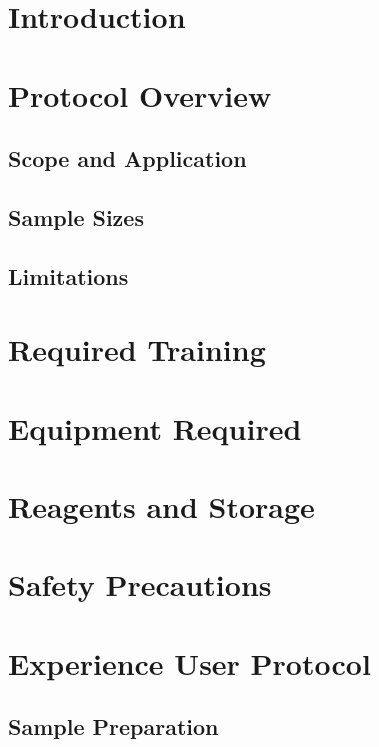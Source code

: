 
\LongTitle{}
\version{}


\protocols{}

\clearpage
\sectTOC{}
\clearpage

\section{Introduction}

\section{Protocol Overview}
\subsection{Scope and Application}
\subsection{Sample Sizes}
\subsection{Limitations}

\section{Required Training}

\section{Equipment Required}

\section{Reagents and Storage}

\section{Safety Precautions}

\section{Experience User Protocol}
\subsection{Sample Preparation}
